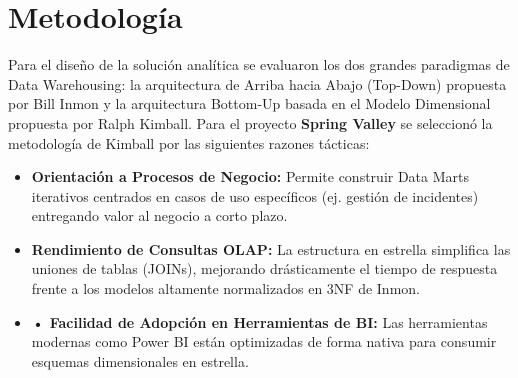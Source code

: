 \section{Metodología}
Para el diseño de la solución analítica se evaluaron los dos grandes paradigmas de Data Warehousing: la arquitectura de Arriba hacia Abajo (Top-Down) propuesta por Bill Inmon y la arquitectura Bottom-Up basada en el Modelo Dimensional propuesta por Ralph Kimball. Para el proyecto \textbf{Spring Valley} se seleccionó la metodología de Kimball por las siguientes razones tácticas:
\begin{itemize}
	\item \textbf{Orientación a Procesos de Negocio:} Permite construir Data Marts iterativos centrados en casos de uso específicos (ej. gestión de incidentes) entregando valor al negocio a corto plazo.
	\item \textbf{Rendimiento de Consultas OLAP:} La estructura en estrella simplifica las uniones de tablas (JOINs), mejorando drásticamente el tiempo de respuesta frente a los modelos altamente normalizados en 3NF de Inmon.
	\item \textbf{•	Facilidad de Adopción en Herramientas de BI:} Las herramientas modernas como Power BI están optimizadas de forma nativa para consumir esquemas dimensionales en estrella.
\end{itemize}

